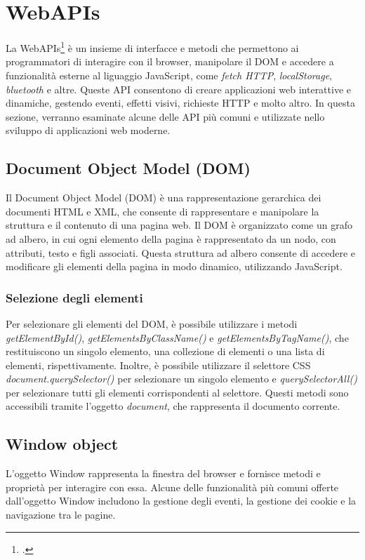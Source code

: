 \section{WebAPIs}
La WebAPIs\footcite{webapis} è un insieme di interfacce e metodi che permettono ai programmatori di interagire con il browser, manipolare
il DOM e accedere a funzionalità esterne al liguaggio JavaScript, come \emph{fetch HTTP}, \emph{localStorage}, \emph{bluetooth} e altre. Queste API consentono di creare applicazioni web interattive e dinamiche, gestendo eventi, effetti visivi,
richieste HTTP e molto altro. In questa sezione, verranno esaminate alcune delle API più comuni e utilizzate nello
sviluppo di applicazioni web moderne.

\subsection{Document Object Model (DOM)}
Il Document Object Model (DOM) è una rappresentazione gerarchica dei documenti HTML e XML, che consente di rappresentare
e manipolare la struttura e il contenuto di una pagina web. Il DOM è organizzato come un grafo ad albero, in cui ogni
elemento della pagina è rappresentato da un nodo, con attributi, testo e figli associati. Questa struttura ad albero
consente di accedere e modificare gli elementi della pagina in modo dinamico, utilizzando JavaScript.

\subsubsection{Selezione degli elementi}
Per selezionare gli elementi del DOM, è possibile utilizzare i metodi \textit{getElementById()},
\textit{getElementsByClassName()} e \textit{getElementsByTagName()}, che restituiscono un singolo
elemento, una collezione di elementi o una lista di elementi, rispettivamente. Inoltre, è possibile utilizzare il
selettore CSS \textit{document.querySelector()} per selezionare un singolo elemento e
\textit{querySelectorAll()} per selezionare tutti gli elementi corrispondenti al selettore.
Questi metodi sono accessibili tramite l'oggetto \textit{document}, che rappresenta il documento corrente.

\subsection{Window object}
L'oggetto Window rappresenta la finestra del browser e fornisce metodi e proprietà per interagire con essa. Alcune delle funzionalità più comuni offerte dall'oggetto Window includono la gestione degli eventi, la gestione dei cookie e la navigazione tra le pagine.

